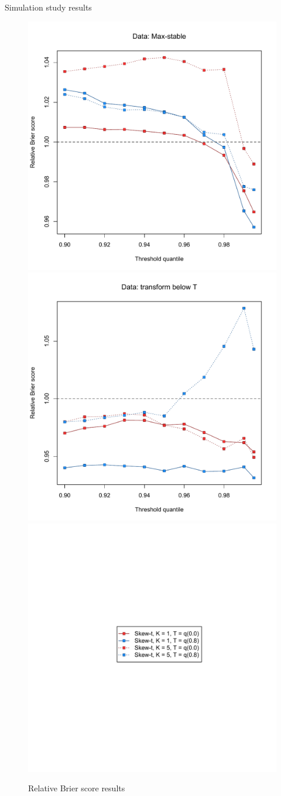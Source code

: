 \documentclass{beamer}
\begin{document}
\begin{frame}{Simulation study results}
\centering
  \begin{figure}
    \includegraphics[width=0.45\linewidth]{./plots/pot/bs-sim-max.pdf}
    \includegraphics[width=0.45\linewidth]{./plots/pot/bs-sim-transform.pdf}\\
    \includegraphics[width=0.3\linewidth, trim=2in 3.25in 2in 3in]{./plots/pot/bs-sim-legend.pdf}
    \caption{Relative Brier score results}
  \end{figure}
\end{frame}

\end{document}
